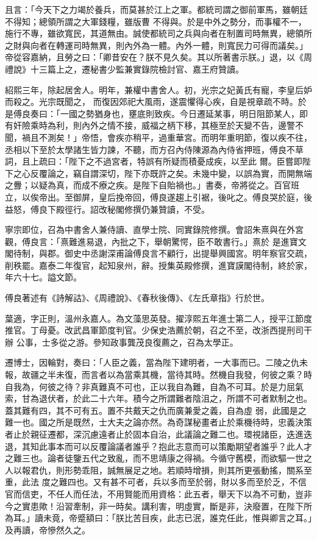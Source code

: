 \begin{pinyinscope}
 且言：「今天下之力竭於養兵，而莫甚於江上之軍。都統司謂之御前軍馬，雖朝廷不得知；總領所謂之大軍錢糧，雖版曹
 不得與。於是中外之勢分，而事權不一，施行不專，雖欲寬民，其道無由。誠使都統司之兵與向者在制置司時無異，總領所之財與向者在轉運司時無異，則內外為一體。內外一體，則寬民力可得而議矣。」帝從容嘉納，且勞之曰：「卿昔安在？朕不見久矣。其以所著書示朕。」退，以《周禮說》十三篇上之，遷秘書少監兼實錄院檢討官、嘉王府贊讀。



 紹熙三年，除起居舍人。明年，兼權中書舍人。初，光宗之妃黃氏有寵，李皇后妒而殺之。光宗既聞之，
 而復因郊祀大風雨，遂震懼得心疾，自是視章疏不時。於是傅良奏曰：「一國之勢猶身也，壅底則致疾。今日遷延某事，明日阻節某人，即有奸險乘時為利，則內外之情不接，威福之柄下移，其極至於天變不告，邊警不聞，禍且不測矣！」帝悟，會疾亦稍平，過重華宮。而明年重明節，復以疾不往，丞相以下至於太學諸生皆力諫，不聽，而方召內侍陳源為內侍省押班，傅良不草詞，且上疏曰：「陛下之不過宮者，特誤有所疑而積憂成疾，以至此
 爾。臣嘗即陛下之心反覆論之，竊自謂深切，陛下亦既許之矣。未幾中變，以誤為實，而開無端之釁；以疑為真，而成不療之疾。是陛下自貽禍也。」書奏，帝將從之。百官班立，以俟帝出。至御屏，皇后挽帝回，傅良遂趨上引裾，後叱之。傅良哭於庭，後益怒，傅良下殿徑行。詔改秘閣修撰仍兼贊讀，不受。



 寧宗即位，召為中書舍人兼侍讀、直學士院、同實錄院修撰。會詔朱熹與在外宮觀，傅良言：「熹難進易退，內批之下，舉朝驚愕，臣不敢書行。」熹於
 是進寶文閣待制，與郡。御史中丞謝深甫論傅良言不顧行，出提舉興國宮。明年察官交疏，削秩罷。嘉泰二年復官，起知泉州，辭。授集英殿修撰，進寶謨閣待制，終於家，年六十七。謚文節。



 傅良著述有《詩解詁》、《周禮說》、《春秋後傳》、《左氏章指》行於世。



 葉適，字正則，溫州永嘉人。為文藻思英發。擢淳熙五年進士第二人，授平江節度推官。丁母憂。改武昌軍節度判官。少保史浩薦於朝，召之不至，改浙西提刑司干辦
 公事，士多從之游。參知政事龔茂良復薦之，召為太學正。



 遷博士，因輪對，奏曰：「人臣之義，當為陛下建明者，一大事而已。二陵之仇未報，故疆之半未復，而言者以為當乘其機，當待其時。然機自我發，何彼之乘？時自我為，何彼之待？非真難真不可也，正以我自為難，自為不可耳。於是力屈氣索，甘為退伏者，於此二十六年。積今之所謂難者陰沮之，所謂不可者默制之也。蓋其難有四，其不可有五。置不共戴天之仇而廣兼愛之義，自為虛
 弱，此國是之難一也。國之所是既然，士大夫之論亦然。為奇謀秘畫者止於乘機待時，忠義決策者止於親征遷都，深沉慮遠者止於固本自治，此議論之難二也。環視諸臣，迭進迭退，其知此事本而可以反覆論議者誰乎？抱此志意而可以策勵期望者誰乎？此人才之難三也。論者徒鑒五代之致亂，而不思靖康之得禍。今循守舊模，而欲驅一世之人以報君仇，則形勢乖阻，誠無展足之地。若順時增損，則其所更張動搖，關系至重，此法
 度之難四也。又有甚不可者，兵以多而至於弱，財以多而至於乏，不信官而信吏，不任人而任法，不用賢能而用資格：此五者，舉天下以為不可動，豈非今之實患歟！沿習牽制，非一時矣。講利害，明虛實，斷是非，決廢置，在陛下所為耳。」讀未竟，帝蹙額曰：「朕比苦目疾，此志已泯，誰克任此，惟與卿言之耳。」及再讀，帝慘然久之。




\end{pinyinscope}
